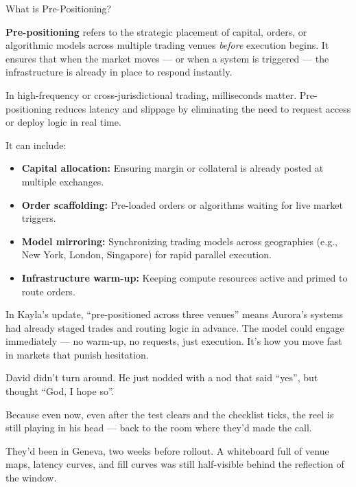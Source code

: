 \medskip

\begin{TechnicalSidebar}{What is Pre-Positioning?}

  \textbf{Pre-positioning} refers to the strategic placement of capital, orders, or algorithmic models across multiple 
  trading venues \textit{before} execution begins.  
  It ensures that when the market moves — or when a system is triggered — the infrastructure is already in place to 
  respond instantly.

  \medskip

  In high-frequency or cross-jurisdictional trading, milliseconds matter.  
  Pre-positioning reduces latency and slippage by eliminating the need to request access or deploy logic in real time.

  \medskip

  It can include:

  \begin{itemize}
    \item \textbf{Capital allocation:} Ensuring margin or collateral is already posted at multiple exchanges.
    \item \textbf{Order scaffolding:} Pre-loaded orders or algorithms waiting for live market triggers.
    \item \textbf{Model mirroring:} Synchronizing trading models across geographies (e.g., New York, London, Singapore) 
    for rapid parallel execution.
    \item \textbf{Infrastructure warm-up:} Keeping compute resources active and primed to route orders.
  \end{itemize}

  \medskip

  In Kayla’s update, “pre-positioned across three venues” means Aurora’s systems had already staged trades and routing 
  logic in advance.  
  The model could engage immediately — no warm-up, no requests, just execution. It’s how you move fast in markets that 
  punish hesitation.

\end{TechnicalSidebar}

\medskip

David didn’t turn around. He just nodded with a nod that said ``yes'', but thought ``God, I hope so''.

Because even now, even after the test clears and the checklist ticks, the reel is still playing in his head — 
back to the room where they’d made the call.

They’d been in Geneva, two weeks before rollout. A whiteboard full of venue maps, latency curves, and fill 
curves was still half-visible behind the reflection of the window.

